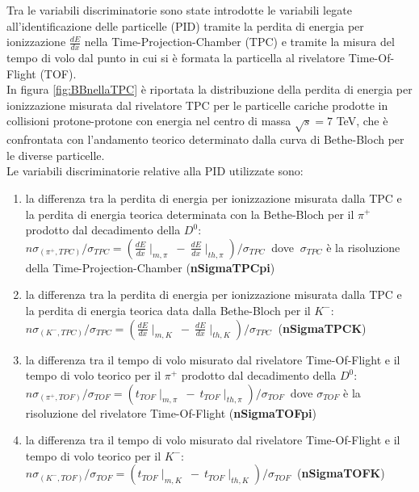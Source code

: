  
 
    
    Tra le variabili discriminatorie sono state introdotte le variabili legate all'identificazione delle particelle (PID) tramite la perdita di energia per ionizzazione $\frac{dE}{dx}$ nella Time-Projection-Chamber (TPC) e tramite la misura del tempo di volo dal punto in cui si è formata la particella al rivelatore Time-Of-Flight (TOF).
    \\In figura \ref{fig:BBnellaTPC} è riportata la distribuzione della perdita di energia per ionizzazione misurata dal rivelatore TPC per le particelle cariche prodotte in collisioni protone-protone con energia nel centro di massa $\sqrt{s} = 7 $ TeV, che è confrontata con l'andamento teorico determinato dalla curva di Bethe-Bloch per le diverse particelle.
    \\ Le variabili discriminatorie relative alla PID utilizzate sono:
        \begin{enumerate}[resume]
            \item la differenza tra la perdita di energia per ionizzazione misurata dalla TPC e la perdita di energia teorica determinata con la Bethe-Bloch per il $\pi^+$ prodotto dal decadimento della $D^0$: $n\sigma_{(\pi^+,TPC)}/\sigma_{TPC} = (\frac{dE}{dx}\mid_{m, \pi} \ - \ \frac{dE}{dx}\mid_{th, \pi} ) / \sigma_{TPC} \ $ dove $ \ \sigma_{TPC}$ è la risoluzione della Time-Projection-Chamber (\textbf{nSigmaTPCpi})
            \item la differenza tra la perdita di energia per ionizzazione misurata dalla TPC e la perdita di energia teorica data dalla Bethe-Bloch per il $K^-$: $n\sigma_{(K^-,TPC)}/\sigma_{TPC} = (\frac{dE}{dx}\mid_{m,K} \ - \ \frac{dE}{dx}\mid_{th,K} ) / \sigma_{TPC} \ $ (\textbf{nSigmaTPCK})
            \item la differenza tra il tempo di volo misurato dal rivelatore Time-Of-Flight e il tempo di volo teorico per il  $\pi^+$ prodotto dal decadimento della $D^0$: $ n\sigma_{(\pi^+,TOF)}/\sigma_{TOF} = (t_{TOF}\mid_{m,\pi} \ - \ t_{TOF}\mid_{th,\pi}) / \sigma_{TOF} \ $ dove $\sigma_{TOF}$ è la risoluzione del rivelatore Time-Of-Flight (\textbf{nSigmaTOFpi})
            \item la differenza tra il tempo di volo misurato dal rivelatore Time-Of-Flight e il tempo di volo teorico per il  $K^-$: $n\sigma_{(K^-,TOF)}/\sigma_{TOF} = (t_{TOF}\mid_{m,K} \ - \ t_{TOF}\mid_{th,K})/\sigma_{TOF} \ $ (\textbf{nSigmaTOFK})
        \end{enumerate}
    
